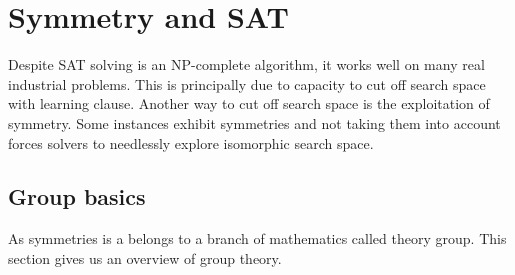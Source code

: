 ﻿\chapter{Symmetry and SAT}\label{chap:symmetryinsat}

Despite SAT solving is an NP-complete algorithm, it works well on many real industrial problems. This is 
principally due to capacity to cut off search space with learning clause. Another way to cut off 
search space is the exploitation of symmetry. Some instances exhibit symmetries and not taking them into account 
forces solvers to needlessly explore isomorphic search space.  


\section{Group basics}
As symmetries is a belongs to a branch of mathematics called theory group.
This section gives us an overview of group theory.

